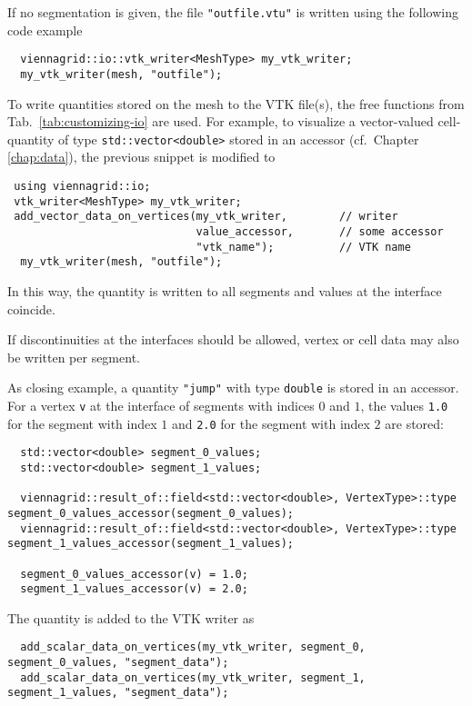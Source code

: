  If no segmentation is given, the file \lstinline|"outfile.vtu"| is written using the following code example
 \begin{lstlisting}
  viennagrid::io::vtk_writer<MeshType> my_vtk_writer;
  my_vtk_writer(mesh, "outfile");
 \end{lstlisting}

 To write quantities stored on the mesh to the VTK file(s), the free functions from Tab.~\ref{tab:customizing-io} are used.
 For example, to visualize a vector-valued cell-quantity of type \lstinline|std::vector<double>| stored in an accessor (cf.~Chapter \ref{chap:data}), the previous snippet is modified to
 \begin{lstlisting}
 using viennagrid::io;
 vtk_writer<MeshType> my_vtk_writer;
 add_vector_data_on_vertices(my_vtk_writer,        // writer
                             value_accessor,       // some accessor
                             "vtk_name");          // VTK name
  my_vtk_writer(mesh, "outfile");
 \end{lstlisting}
 In this way, the quantity is written to all segments and values at the interface coincide.

 If discontinuities at the interfaces should be allowed, vertex or cell data may also be written per segment.

 As closing example, a quantity \lstinline|"jump"| with type \lstinline|double| is stored in an accessor.
 For a vertex \lstinline|v| at the interface of segments with indices $0$ and $1$, the values \lstinline|1.0| for the segment with index $1$ and \lstinline|2.0| for the segment with index $2$ are stored:
 \begin{lstlisting}
  std::vector<double> segment_0_values;
  std::vector<double> segment_1_values;

  viennagrid::result_of::field<std::vector<double>, VertexType>::type segment_0_values_accessor(segment_0_values);
  viennagrid::result_of::field<std::vector<double>, VertexType>::type segment_1_values_accessor(segment_1_values);

  segment_0_values_accessor(v) = 1.0;
  segment_1_values_accessor(v) = 2.0;
 \end{lstlisting}

 The quantity is added to the VTK writer as
 \begin{lstlisting}
  add_scalar_data_on_vertices(my_vtk_writer, segment_0, segment_0_values, "segment_data");
  add_scalar_data_on_vertices(my_vtk_writer, segment_1, segment_1_values, "segment_data");
 \end{lstlisting}

